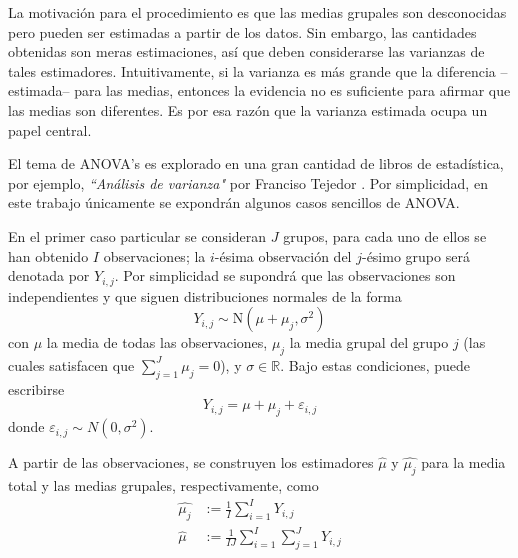 \documentclass[12pt,letterpaper]{book}
\newcommand{\R}{\mathbb{R}}
\begin{document}
La motivación para el procedimiento es que las medias grupales son desconocidas pero pueden ser estimadas a partir de los datos.
%
Sin embargo, las cantidades obtenidas son meras estimaciones, así que deben considerarse las varianzas de tales estimadores.
%
Intuitivamente, si la varianza es más grande que la diferencia --estimada-- para las medias, entonces la evidencia no es suficiente para afirmar que las medias son diferentes.
%
Es por esa razón que la varianza estimada ocupa un papel central.



El tema de ANOVA's es explorado en una gran cantidad de libros de estadística, por ejemplo, \textit{``Análisis de varianza"} por Franciso Tejedor \cite{tejedor99}.
%
Por simplicidad, en este trabajo únicamente se expondrán algunos casos sencillos de ANOVA.

En el primer caso particular se consideran $J$ grupos, para cada uno de ellos se han obtenido $I$ observaciones; la $i$-ésima observación del $j$-ésimo grupo será denotada por $Y_{i,j}$.
%
Por simplicidad se supondrá que las observaciones son independientes y que siguen distribuciones normales de la forma 
\begin{equation}
Y_{i,j} \sim \text{N}(\mu+\mu_j, \sigma^2)
\end{equation}
con $\mu$ la media de todas las observaciones, $\mu_j$ la media grupal del grupo $j$ (las cuales satisfacen que $\sum_{j = 1}^J \mu_j = 0$), y $\sigma\in \R$.
%
%
%
Bajo estas condiciones, puede escribirse
\begin{equation}
Y_{i,j} = \mu + \mu_j + \varepsilon_{i,j}
\end{equation}
donde $\varepsilon_{i,j}\sim N(0,\sigma^2)$. 

A partir de las observaciones, se construyen los estimadores $\widehat{\mu}$ y $\widehat{\mu_j}$ para la media total y las medias grupales, respectivamente, como
\begin{align}
\widehat{\mu_j} &{:=}  \frac{1}{I} \sum_{i = 1}^{I} Y_{i,j} \\
\widehat{\mu}   &{:=}  \frac{1}{I J} \sum_{i = 1}^{I} \sum_{j = 1}^{J} Y_{i,j}
\end{align}
\end{document}
